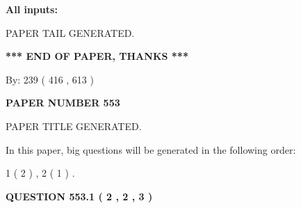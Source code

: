 \documentclass[12pt]{article}
\begin{document}
   
   
   
\noindent{}
   
   
   
   
\noindent\vspace{0.1in}\hspace{-0.08in} {\textbf{\Large{All inputs: }}}
   
   
   
   
   
   
 \vspace{0.2in}
 
   
   
\vspace{2.0in} PAPER TAIL GENERATED.
   
   
   
   
\vspace{1.0in} 
{\textbf{\large{ *** END OF PAPER, THANKS *** }}} 
   
   
\hspace{1.0in} By: 
 239 ( 416 ,  613 )
   
   
   
   
\newpage 
\setcounter{page}{ 
   553001 } 
   
   
   
   
 {\textbf{ \Large{ PAPER NUMBER  553  }}}
   
   
\vspace{0.2in}
   
   
   
   
   
   
   
   
 \vspace{0.2in}
 
 
 
 
   
   
 PAPER TITLE GENERATED.
   
   
   
\vspace{0.2in}
   
In this paper, big questions will be generated in the following order: 
   
   
   1 ( 2 )
 ,
   2 ( 1 )
 .
  
\vspace{0.2in}
  
{\textbf{\Large{QUESTION
553.1 
 ( 2 , 2 , 3 )
}}}
  
\end{document}
